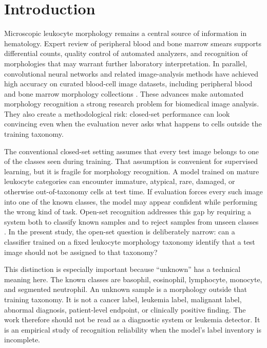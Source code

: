 \section{Introduction}

Microscopic leukocyte morphology remains a central source of information in hematology. Expert review of peripheral blood and bone marrow smears supports differential counts, quality control of automated analyzers, and recognition of morphologies that may warrant further laboratory interpretation. In parallel, convolutional neural networks and related image-analysis methods have achieved high accuracy on curated blood-cell image datasets, including peripheral blood and bone marrow morphology collections \cite{walter2023_ai_hematology,khan2021_wbc_review,deshpande2021_blood_cells_review,acevedo2019_peripheral_blood_cnn,matek2019_blast,matek2021_bone_marrow}. These advances make automated morphology recognition a strong research problem for biomedical image analysis. They also create a methodological risk: closed-set performance can look convincing even when the evaluation never asks what happens to cells outside the training taxonomy.

The conventional closed-set setting assumes that every test image belongs to one of the classes seen during training. That assumption is convenient for supervised learning, but it is fragile for morphology recognition. A model trained on mature leukocyte categories can encounter immature, atypical, rare, damaged, or otherwise out-of-taxonomy cells at test time. If evaluation forces every such image into one of the known classes, the model may appear confident while performing the wrong kind of task. Open-set recognition addresses this gap by requiring a system both to classify known samples and to reject samples from unseen classes \cite{scheirer2013_open_set,geng2021_osr_survey,bendale2016_openmax,yang2024_generalized_ood}. In the present study, the open-set question is deliberately narrow: can a classifier trained on a fixed leukocyte morphology taxonomy identify that a test image should not be assigned to that taxonomy?

This distinction is especially important because ``unknown'' has a technical meaning here. The known classes are basophil, eosinophil, lymphocyte, monocyte, and segmented neutrophil. An unknown sample is a morphology outside that training taxonomy. It is not a cancer label, leukemia label, malignant label, abnormal diagnosis, patient-level endpoint, or clinically positive finding. The work therefore should not be read as a diagnostic system or leukemia detector. It is an empirical study of recognition reliability when the model's label inventory is incomplete.

